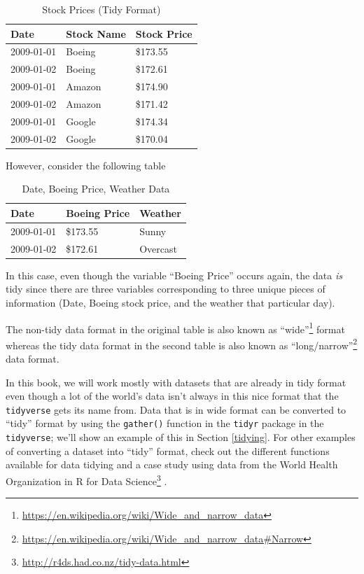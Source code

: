 \documentclass[12pt,]{krantz}
\renewcommand{\href}[2]{#2\footnote{\url{#1}}}
\theoremstyle{definition}
\theoremstyle{definition}
\theoremstyle{definition}
\theoremstyle{remark}
\begin{document}
\begin{table}[H]

\caption{\label{tab:unnamed-chunk-62}Stock Prices (Tidy Format)}
\centering
\fontsize{10}{12}\selectfont
\begin{tabular}[t]{lll}
\toprule
Date & Stock Name & Stock Price\\
\midrule
2009-01-01 & Boeing & \$173.55\\
2009-01-02 & Boeing & \$172.61\\
2009-01-01 & Amazon & \$174.90\\
2009-01-02 & Amazon & \$171.42\\
2009-01-01 & Google & \$174.34\\
2009-01-02 & Google & \$170.04\\
\bottomrule
\end{tabular}
\end{table}

However, consider the following table

\begin{table}[H]

\caption{\label{tab:unnamed-chunk-63}Date, Boeing Price, Weather Data}
\centering
\fontsize{10}{12}\selectfont
\begin{tabular}[t]{lll}
\toprule
Date & Boeing Price & Weather\\
\midrule
2009-01-01 & \$173.55 & Sunny\\
2009-01-02 & \$172.61 & Overcast\\
\bottomrule
\end{tabular}
\end{table}

In this case, even though the variable ``Boeing Price'' occurs again,
the data \emph{is} tidy since there are three variables corresponding to
three unique pieces of information (Date, Boeing stock price, and the
weather that particular day).

The non-tidy data format in the original table is also known as
\href{https://en.wikipedia.org/wiki/Wide_and_narrow_data}{``wide''}
format whereas the tidy data format in the second table is also known as
\href{https://en.wikipedia.org/wiki/Wide_and_narrow_data\#Narrow}{``long/narrow''}
data format.

In this book, we will work mostly with datasets that are already in tidy
format even though a lot of the world's data isn't always in this nice
format that the \texttt{tidyverse} gets its name from. Data that is in
wide format can be converted to ``tidy'' format by using the
\texttt{gather()} function in the \texttt{tidyr} package \citep{R-tidyr}
in the \texttt{tidyverse}; we'll show an example of this in Section
\ref{tidying}. For other examples of converting a dataset into ``tidy''
format, check out the different functions available for data tidying and
a case study using data from the World Health Organization in
\href{http://r4ds.had.co.nz/tidy-data.html}{R for Data Science}
\citep{rds2016}.
\end{document}
